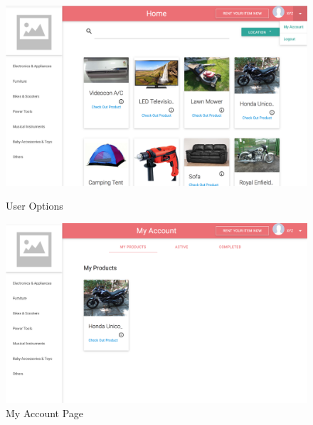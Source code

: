 \documentclass[11pt]{report}
\begin{document}
    \begin{figure}[h]
  \centering
    \includegraphics[width=6in]{options.png} 
	\caption{User Options}
\vspace{0.5in}
  \centering
    \includegraphics[width=6in]{myaccount.png} 
	\caption{My Account Page}
	\end{figure}
\end{document}
